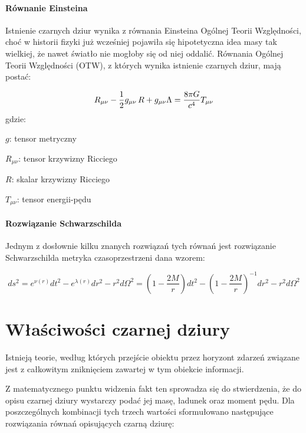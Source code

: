 \documentclass[12pt]{article}
\begin{document}
\paragraph{R\'{o}wnanie Einsteina}
Istnienie czarnych dziur wynika z r\'{o}wnania Einsteina Og\'{o}lnej Teorii Wzgl\k{e}dno\'{s}ci, cho\'{c} w historii fizyki ju\.{z} wcze\'{s}niej pojawi\l{}a si\k{e} hipotetyczna idea masy tak wielkiej, \.{z}e nawet \'{s}wiat\l{}o nie mog\l{}oby si\k{e} od niej oddali\'{c}. R\'{o}wnania Og\'{o}lnej Teorii Wzgl\k{e}dno\'{s}ci (OTW), z kt\'{o}rych wynika istnienie czarnych dziur, maj\k{a} posta\'{c}:

\begin{equation*}
R_{\mu \nu} - {1 \over 2}g_{\mu \nu}\,R + g_{\mu \nu} \Lambda = 
 {8 \pi G \over c^4} T_{\mu \nu}
\end{equation*}
gdzie:
\begin{description}
    \item $g$: tensor metryczny
    \item $R_{\mu \nu}$: tensor krzywizny Ricciego
    \item $R$: skalar krzywizny Ricciego
    \item $T_{\mu \nu}$: tensor energii-p\k{e}du
\end{description}


\paragraph{Rozwi\k{a}zanie Schwarzschilda}
Jednym z dos\l{}ownie kilku znanych rozwi\k{a}za\'{n} tych r\'{o}wna\'{n} jest rozwi\k{a}zanie Schwarzschilda \textendash{} metryka czasoprzestrzeni dana wzorem:

\begin{equation*}
ds^2 = e^{\nu(r)} dt^2 - e^{\lambda(r)} dr^2 - r^2 d\Omega^2 = \left(1 - \frac{2M}{r}\right) dt^2 - \left(1 - \frac{2M}{r}\right)^{-1}dr^2 - r^2 d\Omega^2
\end{equation*}
\newpage

\section{W\l{}a\'{s}ciwo\'{s}ci czarnej dziury}
Istniej\k{a} teorie, wed\l{}ug kt\'{o}rych przej\'{s}cie obiektu przez horyzont zdarze\'{n} zwi\k{a}zane jest z ca\l{}kowitym znikni\k{e}ciem zawartej w tym obiekcie informacji.

Z matematycznego punktu widzenia fakt ten sprowadza si\k{e} do stwierdzenia, \.{z}e do opisu czarnej dziury wystarczy poda\'{c} jej mas\k{e}, \l{}adunek oraz moment p\k{e}du. Dla poszczeg\'{o}lnych kombinacji tych trzech warto\'{s}ci sformu\l{}owano nast\k{e}puj\k{a}ce rozwi\k{a}zania r\'{o}wna\'{n} opisuj\k{a}cych czarn\k{a} dziur\k{e}:
 
\end{document}
